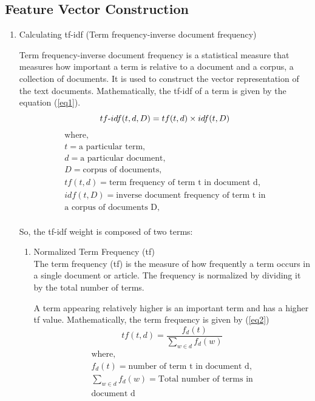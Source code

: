 \documentclass[conference]{IEEEtran}
\begin{document}
\subsection{Feature Vector Construction}
\renewcommand{\labelenumii}{\roman{enumii}}
 \begin{enumerate}
   \item Calculating tf-idf (Term frequency-inverse document frequency)
     \medskip

   Term frequency-inverse document frequency is a statistical measure that
   measures how important a term is relative to a document and a corpus, a
   collection of documents. It is used to construct the vector representation of
   the text documents. Mathematically, the tf-idf of a term is given by the
   equation (\ref{eq1}). 
\begin{equation}tf\textnormal{-}idf(t,d, D) = tf(t,d) \times idf(t, D) \label{eq1}
\end{equation}
   \begin{gather*}
  \text{where},\\
  t=\text{a particular term}, \\
  d=\text{a particular document}, \\
  D=\text{corpus of documents}, \\
  tf(t,d)=\text{term frequency of term t in document d}, \\
  idf(t,D)=\text{inverse document frequency of term t in}\\ \text{a corpus of documents D}, \\
\end{gather*}


So, the tf-idf weight is composed of two terms:
\medskip
   \begin{enumerate}
     \item Normalized Term Frequency (tf)\\
     The term frequency (tf) is the measure of how frequently a term occurs in a
     single document or article. The frequency is normalized by dividing it by
     the total number of terms.
\medskip

A term appearing relatively higher is an important term and has a higher tf
value. Mathematically, the term frequency is given by (\ref{eq2})
\begin{equation}tf(t,d) = \frac{f_d(t)}{\sum_{w\in d}{f_d(w)}} \label{eq2}
\end{equation}
   \begin{gather*}
  \text{where},\\
  f_d(t)=\text{number of term t in document d},\\
  \sum_{w\in d}{f_d(w)} = \text{Total number of terms in}\\ \text{document d}
\end{gather*}\medskip


\end{enumerate}
\end{enumerate}
\end{document}
